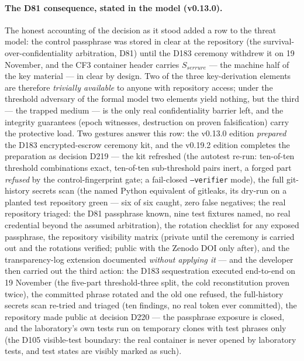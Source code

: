 \documentclass[11pt,a4paper]{article}
\newcommand{\code}[1]{\texttt{\small #1}}
\begin{document}
\paragraph{The D81 consequence, stated in the model (v0.13.0).} The
honest accounting of the decision as it stood added a row to the
threat model: the control passphrase was stored in clear at the repository
(the survival-over-confidentiality arbitration, D81) until the D183
ceremony withdrew it on 19 November, and the CF3 container
header carries $S_{serrure}$ --- the machine half of the key material ---
in clear by design. Two of the three key-derivation elements are
therefore \emph{trivially available} to anyone with repository access;
under the threshold adversary of the formal model two elements yield
nothing, but the third --- the trapped medium --- is the only real
confidentiality barrier left, and the integrity guarantees (epoch
witnesses, destruction on proven falsification) carry the protective
load. Two gestures answer this row: the v0.13.0 edition \emph{prepared}
the D183 encrypted-escrow ceremony kit, and the v0.19.2 edition
completes the preparation as decision D219 --- the kit refreshed (the
autotest re-run: ten-of-ten threshold combinations exact, ten-of-ten
sub-threshold pairs inert, a forged part \emph{refused} by the
control-fingerprint gate; a fail-closed \code{--verifier} mode), the
full git-history secrets scan (the named Python equivalent of gitleaks,
its dry-run on a planted test repository green --- six of six caught,
zero false negatives; the real repository triaged: the D81 passphrase
known, nine test fixtures named, no real credential beyond the assumed
arbitration), the rotation checklist for any exposed passphrase, the
repository visibility matrix (private until the ceremony is carried out and
the rotations verified; public with the Zenodo DOI only after), and the
transparency-log extension documented \emph{without applying it} ---
and the developer then carried out the third action: the D183 sequestration
executed end-to-end on 19 November (the five-part threshold-three
split, the cold reconstitution proven twice), the committed phrase
rotated and the old one refused, the full-history secrets scan
re-tried and triaged (ten findings, no real token ever committed), the
repository made public at decision D220 --- the passphrase exposure is
closed, and the laboratory's own tests run on temporary clones with
test phrases only
(the D105 visible-test boundary: the real container is never opened by
laboratory tests, and test states are visibly marked as such).
\end{document}
